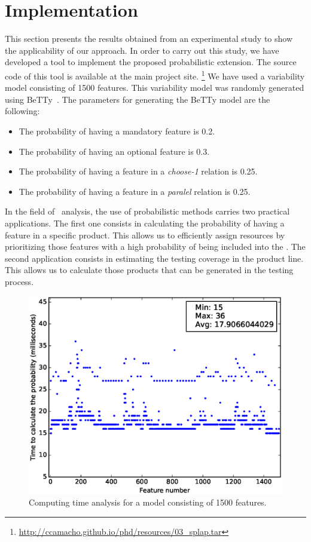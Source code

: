 
\section{Implementation}
\label{sec:stat:impl}


This section presents the results obtained from an experimental study to show the applicability of our
approach. In order to carry out this study, we have developed a tool to implement the proposed probabilistic extension. The source code
of this tool is available at the main project site.
\footnote{\url{http://ccamacho.github.io/phd/resources/03_splap.tar}}
We have used a variability model consisting of
1500 features. This variability model
was randomly generated using BeTTy~\cite{SeguraHBC11}. The parameters for
generating the BeTTy model are the following:

\begin{itemize}
        \item The probability of having a mandatory feature is 0.2.
        \item The probability of having an optional feature is 0.3.
        \item The probability of having a feature in a \emph{choose-1} relation is 0.25.
        \item The probability of having a feature in a \emph{paralel} relation is 0.25.
\end{itemize}

In the field of \SPLs\ analysis, the use of probabilistic methods carries two practical applications. The first one consists in calculating the probability of having a feature in a specific product. This allows us to efficiently assign resources by prioritizing those features with a high probability of being included into the \SPL. The second application consists in estimating the testing coverage in the product line. This
allows us to calculate those products that can be generated in the testing process.

\begin{figure}[h]
        \centering
        \linefigure
        \includegraphics[width=0.8\hsize,angle=0]{plot_probs_times.eps}
        \linefigure
        \caption{Computing time analysis for a model consisting of 1500 features.}\label{fig:plot:probs:times}
\end{figure}

